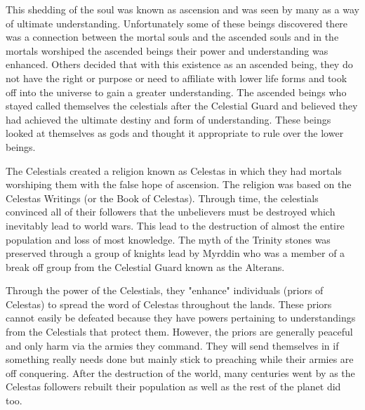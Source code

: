 This shedding of the soul was known as ascension and was seen by many as a way of ultimate understanding. Unfortunately some of these beings discovered there was a connection between the mortal souls and the ascended souls and in the mortals worshiped the ascended beings their power and understanding was enhanced. Others decided that with this existence as an ascended being, they do not have the right or purpose or need to affiliate with lower life forms and took off into the universe to gain a greater understanding. The ascended beings who stayed called themselves the celestials after the Celestial Guard and believed they had achieved the ultimate destiny and form of understanding. These beings looked at themselves as gods and thought it appropriate to rule over the lower beings.

The Celestials created a religion known as Celestas in which they had mortals worshiping them with the false hope of ascension. The religion was based on the Celestas Writings (or the Book of Celestas). Through time, the celestials convinced all of their followers that the unbelievers must be destroyed which inevitably lead to world wars. This lead to the destruction of almost the entire population and loss of most knowledge. The myth of the Trinity stones was preserved through a group of knights lead by Myrddin who was a member of a break off group from the Celestial Guard known as the Alterans. 

Through the power of the Celestials, they "enhance" individuals (priors of Celestas) to spread the word of Celestas throughout the lands. These priors cannot easily be defeated because they have powers pertaining to understandings from the Celestials that protect them. However, the priors are generally peaceful and only harm via the armies they command. They will send themselves in if something really needs done but mainly stick to preaching while their armies are off conquering. After the destruction of the world, many centuries went by as the Celestas followers rebuilt their population as well as the rest of the planet did too.

